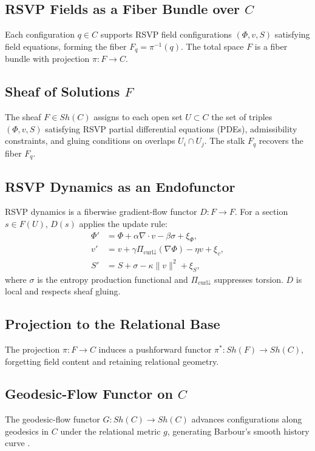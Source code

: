 \documentclass[11pt]{article}
\begin{document}
\subsection{RSVP Fields as a Fiber Bundle over $C$}
Each configuration $q \in C$ supports RSVP field configurations $(\Phi, v, S)$ satisfying field equations, forming the fiber $F_q = \pi^{-1}(q)$. The total space $F$ is a fiber bundle with projection $\pi: F \to C$.

\subsection{Sheaf of Solutions $F$}
The sheaf $F \in Sh(C)$ assigns to each open set $U \subset C$ the set of triples $(\Phi, v, S)$ satisfying RSVP partial differential equations (PDEs), admissibility constraints, and gluing conditions on overlaps $U_i \cap U_j$. The stalk $F_q$ recovers the fiber $F_q$.

\subsection{RSVP Dynamics as an Endofunctor}
RSVP dynamics is a fiberwise gradient-flow functor $D: F \to F$. For a section $s \in F(U)$, $D(s)$ applies the update rule:
\begin{align*}
\Phi' &= \Phi + \alpha \nabla \cdot v - \beta \sigma + \xi_\Phi, \\
v' &= v + \gamma \Pi_{\text{curl}\downarrow} (\nabla \Phi) - \eta v + \xi_v, \\
S' &= S + \sigma - \kappa \|v\|^2 + \xi_S,
\end{align*}
where $\sigma$ is the entropy production functional and $\Pi_{\text{curl}\downarrow}$ suppresses torsion. $D$ is local and respects sheaf gluing.

\subsection{Projection to the Relational Base}
The projection $\pi: F \to C$ induces a pushforward functor $\pi^*: Sh(F) \to Sh(C)$, forgetting field content and retaining relational geometry.

\subsection{Geodesic-Flow Functor on $C$}
The geodesic-flow functor $G: Sh(C) \to Sh(C)$ advances configurations along geodesics in $C$ under the relational metric $g$, generating Barbour’s smooth history curve \citep{Barbour1994}.
\end{document}
